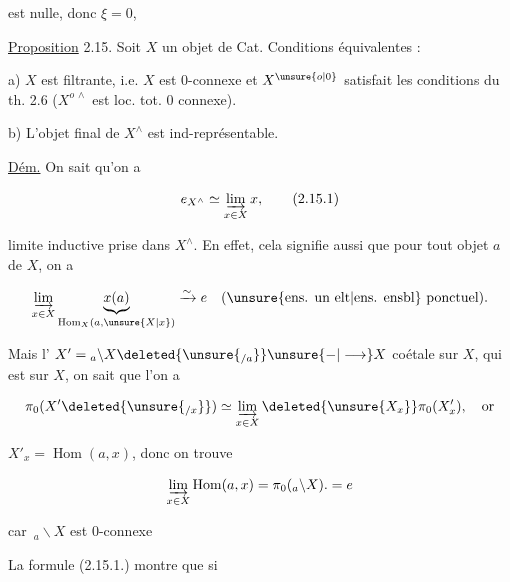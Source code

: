 
 est nulle, donc $\xi=0$, 

\reversemarginpar{}\normalmarginpar

\uline{Proposition} 2.15. Soit $X$ un objet de Cat. Conditions équivalentes :

a) $X$ est filtrante, i.e. $X$ est $0$-connexe et $X^{\unsure{o|0}}$ satisfait les conditions  du th. 2.6 ($X^{o\,\wedge}$ est loc. tot. $0$ connexe).

b)  L'objet final de $X^\wedge$ est ind-représentable.

\uline{Dém.} On sait qu'on a

\[
e_{X^\wedge}\simeq\varinjlim_{x\in X}x,\tag*{(2.15.1)}
\]

limite inductive prise dans $X^\wedge$. En effet, cela signifie aussi que pour tout objet $a$ de $X$, on a

\[
\varinjlim_{x\in X}\underbrace{x(a)}_{\operatorname{Hom}_{X}(a,\unsure{X|x})}\xrightarrow{\sim}e
\quad\text{(\unsure{ens. un elt|ens. ensbl} ponctuel)}.
\]

Mais  l'   $X'={}_{a}\backslash X\deleted{\unsure{_{/a}}}\unsure{\mathbin{-}|\longrightarrow}X$ coétale sur $X$, qui est   sur $X$, on sait que l'on a

\[
\pi_0(X'\deleted{\unsure{_{/x}}})\simeq\varinjlim_{x\in X}\deleted{\unsure{X_x}}\pi_0(X'_x),\quad\text{or}
\]

$X'_x=\operatorname{Hom}(a,x)$, donc on trouve

\[
\varinjlim_{x\in X}\operatorname{Hom}(a,x)=\pi_0({}_{a}\backslash X).=e
\]

car $\,{}_{a}\backslash X$ est $0$-connexe

La formule (2.15.1.) montre que si

